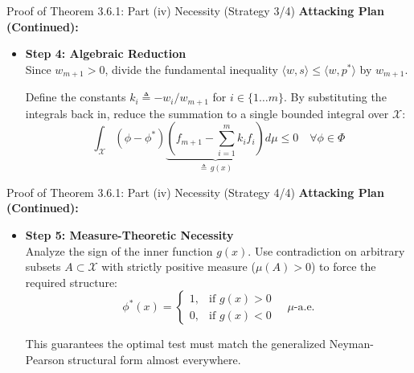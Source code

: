 \documentclass[10pt, aspectratio=169, xcolor=dvipsnames]{beamer}
\newcommand{\lead}[1]{{\color{UniBlue}\bfseries #1}}
\begin{document}
\begin{frame}{Proof of Theorem 3.6.1: Part (iv) Necessity (Strategy 3/4)}
    \lead{Attacking Plan (Continued):}\\
    \vspace{0.4cm}
    \begin{itemize}
        \item[{ \tikz\fill[Teal] (0,0) circle (2pt); }] \textbf{Step 4: Algebraic Reduction}\\
        Since $w_{m+1} > 0$, divide the fundamental inequality $\langle w, s \rangle \le \langle w, p^* \rangle$ by $w_{m+1}$. 
        
        \vspace{0.4cm}
        Define the constants $k_i \triangleq -w_i / w_{m+1}$ for $i \in \{1 \dots m\}$. By substituting the integrals back in, reduce the summation to a single bounded integral over $\mathcal{X}$:
        \[ \int_{\mathcal{X}} (\phi - \phi^*) \underbrace{\left( f_{m+1} - \sum_{i=1}^m k_i f_i \right)}_{\triangleq \, g(x)} d\mu \le 0 \quad \forall \phi \in \Phi \]
    \end{itemize}
\end{frame}

\begin{frame}{Proof of Theorem 3.6.1: Part (iv) Necessity (Strategy 4/4)}
    \lead{Attacking Plan (Continued):}\\
    \vspace{0.4cm}
    \begin{itemize}
        \item[{ \tikz\fill[Teal] (0,0) circle (2pt); }] \textbf{Step 5: Measure-Theoretic Necessity}\\
        Analyze the sign of the inner function $g(x)$. Use contradiction on arbitrary subsets $A \subset \mathcal{X}$ with strictly positive measure ($\mu(A) > 0$) to force the required structure:
        \[ \phi^*(x) = \begin{cases} 1, & \text{if } g(x) > 0 \\ 0, & \text{if } g(x) < 0 \end{cases} \quad \mu\text{-a.e.} \]
        
        \vspace{0.2cm}
        This guarantees the optimal test must match the generalized Neyman-Pearson structural form almost everywhere.
    \end{itemize}
\end{frame}
\end{document}
